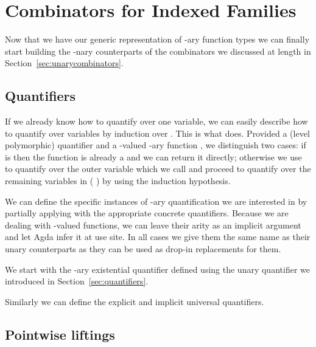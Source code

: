 
\section{Combinators for Indexed Families}\label{sec:narycombinators}

Now that we have our generic representation of -ary function types we can
finally start building the -nary counterparts of the combinators we
discussed at length in Section~\ref{sec:unarycombinators}.

\subsection{Quantifiers}

If we already know how to quantify over one variable, we can easily describe how
to quantify over  variables by induction over . This is what 
does. Provided a (level polymorphic) quantifier  and a -valued
-ary function , we distinguish two cases: if  is  then
the function is already a  and we can return it directly; otherwise we use
 to quantify over the outer variable which we call  and proceed to
quantify over the remaining variables in {( )} by using the induction
hypothesis.


We can define the specific instances of -ary quantification we are interested
in by partially applying  with the appropriate concrete quantifiers.
Because we are dealing with -valued functions, we can leave their arity as
an implicit argument and let Agda infer it at use site. In all cases we give them
the same name as their unary counterparts as they can be used as drop-in replacements
for them.

We start with the -ary existential quantifier defined using the unary
quantifier we introduced in Section~\ref{sec:quantifiers}.


Similarly we can define the explicit and implicit universal quantifiers.


\subsection{Pointwise liftings}

